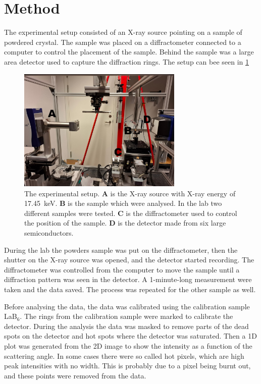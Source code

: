 \section{Method}
The experimental setup consisted of an X-ray source pointing on a sample of powdered crystal. The sample was placed on a diffractometer connected to a computer to control the placement of the sample. Behind the sample was a large area detector used to capture the diffraction rings. The setup can bee seen in \ref{fig:setup}
\begin{figure}[H]
    \centering
    \includegraphics[width=0.7\textwidth]{Figures/setup_letters.jpg}
    \caption{The experimental setup. \textbf{A} is the X-ray source with X-ray energy of \SI{17.45}{\kilo\electronvolt}. \textbf{B} is the sample which were analysed. In the lab two different samples were tested. \textbf{C} is the diffractometer used to control the position of the sample. \textbf{D} is the detector made from six large semiconductors.}
    \label{fig:setup}
\end{figure}

During the lab the powders sample was put on the diffractometer, then the shutter on the X-ray source was opened, and the detector started recording. The diffractometer was controlled from the computer to move the sample until a diffraction pattern was seen in the detector. A 1-minute-long measurement were taken and the data saved. The process was repeated for the other sample as well.

Before analysing the data, the data was calibrated using the calibration sample LaB$_6$. The rings from the calibration sample were marked to calibrate the detector. During the analysis the data was masked to remove parts of the dead spots on the detector and hot spots where the detector was saturated. Then a 1D plot was generated from the 2D image to show the intensity as a function of the scattering angle. In some cases there were so called hot pixels, which are high peak intensities with no width. This is probably due to a pixel being burnt out, and these points were removed from the data.